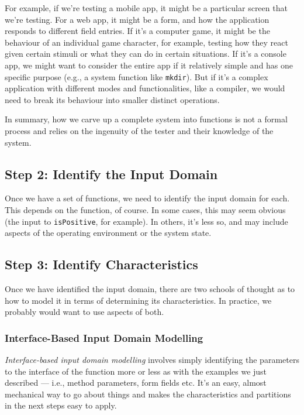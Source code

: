 For example, if we're testing a mobile app, it might be a particular screen that
we're testing. For a web app, it might be a form, and how the application
responds to different field entries. If it's a computer game, it might be the
behaviour of an individual game character, for example, testing how they react
given certain stimuli or what they can do in certain situations. If it's a
console app, we might want to consider the entire app if it relatively simple
and has one specific purpose (e.g., a system function like {\tt mkdir}). But if
it's a complex application with different modes and functionalities, like a
compiler, we would need to break its behaviour into smaller distinct operations.

In summary, how we carve up a complete system into functions is not a formal
process and relies on the ingenuity of the tester and their knowledge of the
system.  

\subsection*{Step 2: Identify the Input Domain}

Once we have a set of functions, we need to identify the input domain for each.
This depends on the function, of course. In some cases, this may seem obvious
(the input to {\tt isPositive}, for example). In others, it's less so, and may
include aspects of the operating environment or the system state. 

\subsection*{Step 3: Identify Characteristics}

Once we have identified the input domain, there are two schools of thought as to
how to model it in terms of determining its characteristics. In practice, we
probably would want to use aspects of both.  

\subsubsection*{Interface-Based Input Domain Modelling}

{\it Interface-based input domain modelling} involves simply identifying the
parameters to the interface of the function more or less as with the examples we
just described --- i.e., method parameters, form fields etc. It's an easy,
almost mechanical way to go about things and makes the characteristics and
partitions in the next steps easy to apply. 

